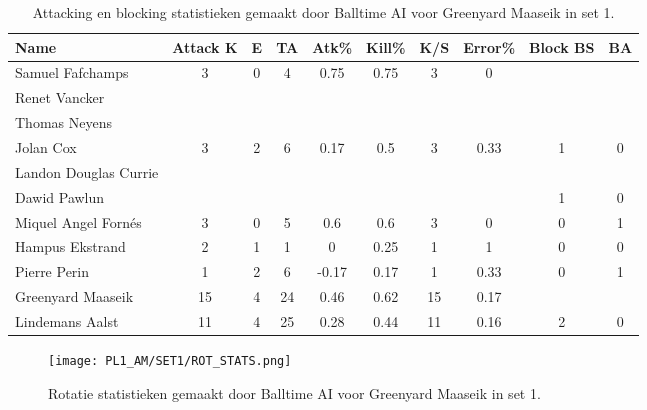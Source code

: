 \begin{table}[ht!]
  \centering
  \scriptsize
  \begin{tabular}{|l|c|c|c|c|c|c|c|c|c|} \hline
    \textbf{Name} & Attack K & E & TA & Atk\% & Kill\% & K/S & Error\% & Block BS & BA \\ \hline
    Samuel Fafchamps & 3 & 0 & 4 & 0.75 & 0.75 & 3 & 0 &   &   \\
    Renet Vancker &   &   &   &   &   &   &   &   &   \\
    Thomas Neyens &   &   &   &   &   &   &   &   &   \\
    Jolan Cox & 3 & 2 & 6 & 0.17 & 0.5 & 3 & 0.33 & 1 & 0 \\
    Landon Douglas Currie &   &   &   &   &   &   &   &   &   \\
    Dawid Pawlun &   &   &   &   &   &   &   & 1 & 0 \\
    Miquel Angel Fornés & 3 & 0 & 5 & 0.6 & 0.6 & 3 & 0 & 0 & 1 \\
    Hampus Ekstrand & 2 & 1 & 1 & 0 & 0.25 & 1 & 1 & 0 & 0 \\
    Pierre Perin & 1 & 2 & 6 & -0.17 & 0.17 & 1 & 0.33 & 0 & 1 \\
    Greenyard Maaseik & 15 & 4 & 24 & 0.46 & 0.62 & 15 & 0.17 &   &   \\
    Lindemans Aalst & 11 & 4 & 25 & 0.28 & 0.44 & 11 & 0.16 & 2 & 0 \\ \hline
    \end{tabular}
  \caption[Attacking en blocking statistieken gemaakt door Balltime AI voor Greenyard Maaseik in set 1]{\label{tab:PL1AttBlockMaaseik1}Attacking en blocking statistieken gemaakt door Balltime AI voor Greenyard Maaseik in set 1.}
\end{table}

\begin{figure}
  \centering
  \texttt{[image: PL1\_AM/SET1/ROT\_STATS.png]}
  \caption{\label{fig:PL1_ROT_STATS_1}Rotatie statistieken gemaakt door Balltime AI voor Greenyard Maaseik in set 1.}
\end{figure}
